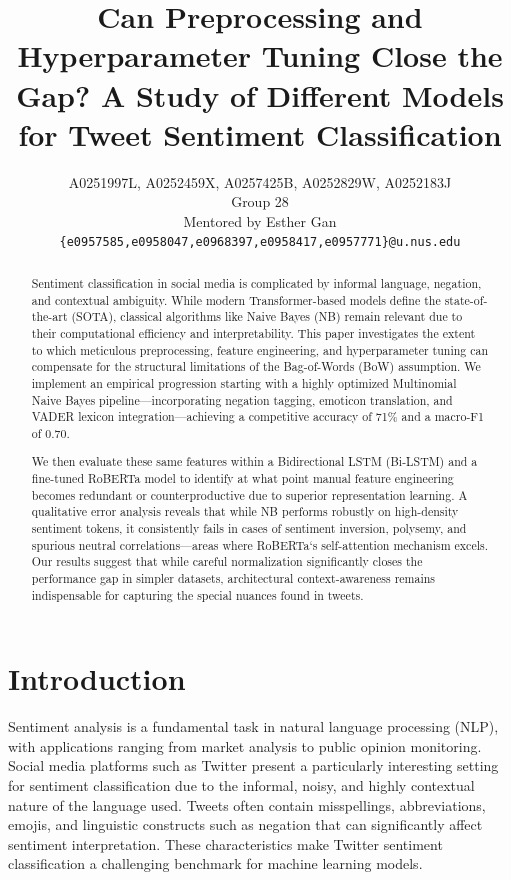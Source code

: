 \documentclass[11pt]{article}
\title{Can Preprocessing and Hyperparameter Tuning Close the Gap? A Study of Different Models for Tweet Sentiment Classification}
\author{A0251997L, A0252459X, A0257425B, A0252829W, A0252183J \\
  Group 28 \\
  Mentored by Esther Gan \\
  \texttt{\{e0957585,e0958047,e0968397,e0958417,e0957771\}@u.nus.edu}}
\begin{document}
\maketitle
\begin{abstract}
Sentiment classification in social media is complicated by informal language, negation, and contextual ambiguity. 
While modern Transformer-based models define the state-of-the-art (SOTA), classical algorithms like Naive Bayes (NB) remain relevant due to their computational efficiency and interpretability. 
This paper investigates the extent to which meticulous preprocessing, feature engineering, and hyperparameter tuning can compensate for the structural limitations of the Bag-of-Words (BoW) assumption. 
We implement an empirical progression starting with a highly optimized Multinomial Naive Bayes pipeline—incorporating negation tagging, emoticon translation, and VADER lexicon integration—achieving a competitive accuracy of 71\% and a macro-F1 of 0.70.

We then evaluate these same features within a Bidirectional LSTM (Bi-LSTM) and a fine-tuned RoBERTa model to identify at what point manual feature engineering becomes redundant or counterproductive due to superior representation learning. 
A qualitative error analysis reveals that while NB performs robustly on high-density sentiment tokens, it consistently fails in cases of sentiment inversion, polysemy, and spurious neutral correlations—areas where RoBERTa`s self-attention mechanism excels. 
Our results suggest that while careful normalization significantly closes the performance gap in simpler datasets, architectural context-awareness remains indispensable for capturing the special nuances found in tweets.
\end{abstract}

\section{Introduction}

Sentiment analysis is a fundamental task in natural language processing (NLP), with applications ranging from market analysis to public opinion monitoring. Social media platforms such as Twitter present a particularly interesting setting for sentiment classification due to the informal, noisy, and highly contextual nature of the language used. Tweets often contain misspellings, abbreviations, emojis, and linguistic constructs such as negation that can significantly affect sentiment interpretation. These characteristics make Twitter sentiment classification a challenging benchmark for machine learning models.
\end{document}
